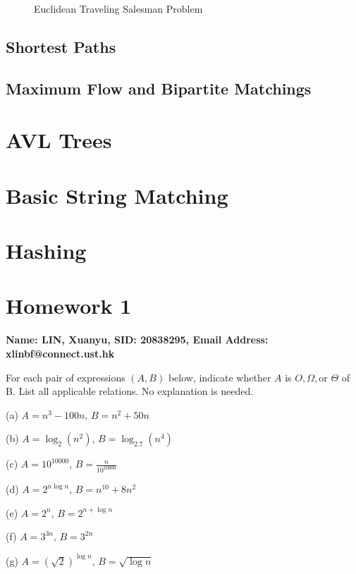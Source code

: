 \documentclass[10pt]{article}
\begin{document}
\begin{figure}[h]
\begin{subfigure}[b]{0.3\textwidth}
	\end{subfigure}
	\caption*{Euclidean Traveling Salesman Problem}
\end{figure}



















\subsection{Shortest Paths}

\subsection{Maximum Flow and Bipartite Matchings}

\section{AVL Trees}

\section{Basic String Matching}

\section{Hashing}

\newpage

\section*{Homework 1}

\textbf{Name: LIN, Xuanyu, SID: 20838295, Email Address: xlinbf@connect.ust.hk}

\begin{Problem}
	
	For each pair of expressions $(A, B)$ below, indicate whether $A$
	is $O, \Omega, \text{or } \Theta$ of B. List all applicable relations. No explanation is needed.
	
	\noindent (a) $A = n^3-100n$, $B = n^2+50n$
	
	\noindent (b) $A = \log_2(n^2)$, $B = \log_{2.7}(n^4)$
	
	\noindent (c) $A = 10^{10000}$, $B = \frac{n}{10^{10000}}$
	
	\noindent (d) $A = 2^{n\log n}$, $B = n^{10}+8n^2$
	
	\noindent (e) $A = 2^n$, $B = 2^{n+\log n}$
	
	\noindent (f) $A = 3^{3n}$, $B = 3^{2n}$
	
	\noindent (g) $A = (\sqrt{2})^{\log n}$, $B = \sqrt{\log n}$
	
\end{Problem}
\end{document}
